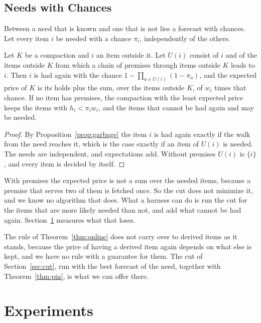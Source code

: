 \documentclass[acmsmall,nonacm,screen]{acmart}
\begin{document}
\subsection{Needs with Chances}

Between a need that is known and one that is not lies a forecast with chances. Let every
item $i$ be needed with a chance $\pi_i$, independently of the others.

\begin{proposition}[Chances]\label{prop:chances}
Let $K$ be a compaction and $i$ an item outside it. Let $U(i)$ consist of $i$ and of the
items outside $K$ from which a chain of premises through items outside $K$ leads to $i$.
Then $i$ is had again with the chance $1 - \prod_{a \in U(i)} (1 - \pi_a)$, and the expected
price of $K$ is its holds plus the sum, over the items outside $K$, of $w_i$ times that
chance. If no item has premises, the compaction with the least expected price keeps the
items with $h_i < \pi_i w_i$, and the items that cannot be had again and may be needed.
\end{proposition}

\begin{proof}
By Proposition~\ref{prop:garbage} the item $i$ is had again exactly if the walk from the need
reaches it, which is the case exactly if an item of $U(i)$ is needed. The needs are
independent, and expectations add. Without premises $U(i)$ is $\{i\}$, and every item is
decided by itself.
\end{proof}

With premises the expected price is not a sum over the needed items, because a premise that
serves two of them is fetched once. So the cut does not minimize it, and we know no
algorithm that does. What a harness can do is run the cut for the items that are more likely
needed than not, and add what cannot be had again. Section~\ref{sec:experiments} measures
what that loses.

The rule of Theorem~\ref{thm:online} does not carry over to derived items as it stands, because the price of having a
derived item again depends on what else is kept, and we have no rule with a guarantee for
them. The cut of Section~\ref{sec:cut}, run with the best forecast of the need, together
with Theorem~\ref{thm:pin}, is what we can offer there.

\section{Experiments}\label{sec:experiments}
\end{document}
